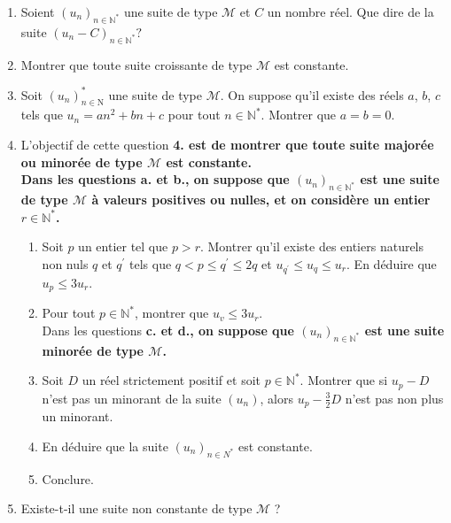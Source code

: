 \documentclass[landscape,twocolumn,leqno,a4paper,10pt]{report} %
\renewcommand{\leq}{\leqslant}
\renewcommand{\textbf}[1]{\begingroup\bfseries\mathversion{bold}#1\endgroup}		%
\begin{document}
\begin{enumerate}
	\item Soient $\left(u_{n}\right)_{n \in \mathbb{N}^{*}}$ une suite de type $\mathscr{M}$ et $C$ un nombre réel. Que dire de la suite $\left(u_{n}-C\right)_{n \in \mathbb{N}^{*}} ?$
	\item Montrer que toute suite croissante de type $\mathscr{M}$ est constante.
	\item Soit $\left(u_{n}\right)_{n \in \mathrm{N}}^{*}$ une suite de type $\mathscr{M}$. On suppose qu'il existe des réels $a$, $b$, $c$ tels que $u_{n}=a n^{2}+b n+c$ pour tout $n \in \mathbb{N}^{*}$. Montrer que $a=b=0$.
	\item L'objectif de cette question \textbf{4.} est de montrer que toute suite majorée ou minorée de type $\mathscr{M}$ est constante.\\
	Dans les questions \textbf{a.} et \textbf{b.}, on suppose que $\left(u_{n}\right)_{n \in \mathbb{N}^{*}}$ est une suite de type $\mathscr{M}$ à valeurs positives ou nulles, et on considère un entier $r \in \mathbb{N}^{*}$.
	\begin{enumerate}
		\item Soit $p$ un entier tel que $p>r$. Montrer qu'il existe des entiers naturels non nuls $q$ et $q^{\prime}$ tels que $q<p \leq q^{\prime} \leq 2 q$ et $u_{q^{\prime}} \leq u_{q} \leq u_{r}$. En déduire que $u_{p} \leq 3 u_{r}$.
		\item Pour tout $p \in \mathbb{N}^{*}$, montrer que $u_{v} \leq 3 u_{r}$.\\
		Dans les questions \textbf{c.} et \textbf{d.}, on suppose que $\left(u_{n}\right)_{n \in \mathbb{N}^{*}}$ est une suite minorée de type $\mathscr{M}$.
		\item Soit $D$ un réel strictement positif et soit $p \in \mathbb{N}^{*}$. Montrer que si $u_{p}-D$ n'est pas un minorant de la suite $\left(u_{n}\right)$, alors $u_{p}-\frac{3}{2} D$ n'est pas non plus un minorant.
		\item En déduire que la suite $\left(u_{n}\right)_{n \in N^{*}}$ est constante.
		\item Conclure.
	\end{enumerate}
	\item Existe-t-il une suite non constante de type $\mathscr{M}$ ?
\end{enumerate}
\end{document}
